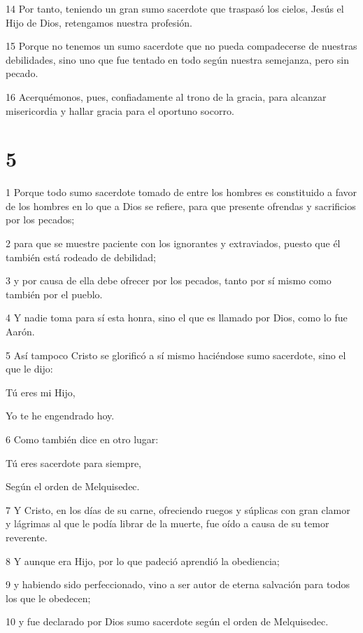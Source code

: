 \par 14 Por tanto, teniendo un gran sumo sacerdote que traspasó los cielos, Jesús el Hijo de Dios, retengamos nuestra profesión.
\par 15 Porque no tenemos un sumo sacerdote que no pueda compadecerse de nuestras debilidades, sino uno que fue tentado en todo según nuestra semejanza, pero sin pecado.
\par 16 Acerquémonos, pues, confiadamente al trono de la gracia, para alcanzar misericordia y hallar gracia para el oportuno socorro.

\chapter{5}

\par 1 Porque todo sumo sacerdote tomado de entre los hombres es constituido a favor de los hombres en lo que a Dios se refiere, para que presente ofrendas y sacrificios por los pecados;
\par 2 para que se muestre paciente con los ignorantes y extraviados, puesto que él también está rodeado de debilidad;
\par 3 y por causa de ella debe ofrecer por los pecados, tanto por sí mismo como también por el pueblo.
\par 4 Y nadie toma para sí esta honra, sino el que es llamado por Dios, como lo fue Aarón.
\par 5 Así tampoco Cristo se glorificó a sí mismo haciéndose sumo sacerdote, sino el que le dijo:
\par Tú eres mi Hijo,
\par Yo te he engendrado hoy.
\par 6 Como también dice en otro lugar:
\par Tú eres sacerdote para siempre,
\par Según el orden de Melquisedec.
\par 7 Y Cristo, en los días de su carne, ofreciendo ruegos y súplicas con gran clamor y lágrimas al que le podía librar de la muerte, fue oído a causa de su temor reverente.
\par 8 Y aunque era Hijo, por lo que padeció aprendió la obediencia;
\par 9 y habiendo sido perfeccionado, vino a ser autor de eterna salvación para todos los que le obedecen;
\par 10 y fue declarado por Dios sumo sacerdote según el orden de Melquisedec.

